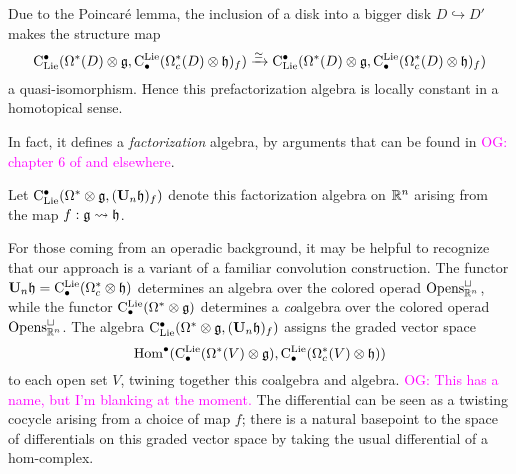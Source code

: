 \documentclass[11pt]{amsart}
\numberwithin{equation}{section}
\def\owen{\textcolor{magenta}{OG: }\textcolor{magenta}}
\begin{document}
Due to the Poincar\'e lemma, the inclusion of a disk into a bigger disk $D \hookrightarrow D'$ makes the structure map 
\[
{\rm C}_{\rm Lie}^\bullet(\Omega^*(D) \otimes \mathfrak g, {\rm C}^{\rm Lie}_\bullet(\Omega^*_c(D) \otimes \mathfrak h)_f) \xrightarrow{\simeq} {\rm C}_{\rm Lie}^\bullet(\Omega^*(D) \otimes \mathfrak g, {\rm C}^{\rm Lie}_\bullet(\Omega^*_c(D) \otimes \mathfrak h)_f)
\]
a quasi-isomorphism.
Hence this prefactorization algebra is locally constant in a homotopical sense.

In fact, it defines a {\em factorization} algebra, by arguments that can be found in \owen{chapter 6 of \cite{CG1} and elsewhere}.

\begin{dfn}
\label{dfn: centralizer for f}
Let ${\rm C}_{\rm Lie}^\bullet(\Omega^* \otimes \mathfrak g, (\mathbf U_n \mathfrak h)_f)$ denote this factorization algebra on $\mathbb R^n$ arising from the map $f: \mathfrak g \rightsquigarrow \mathfrak h$.
\end{dfn}

\begin{rmk}
For those coming from an operadic background, it may be helpful to recognize that our approach is a variant of a familiar convolution construction.
The functor $\mathbf U_n \mathfrak h = {\rm C}^{\rm Lie}_\bullet(\Omega^*_c \otimes \mathfrak h)$ determines an algebra over the colored operad ${\rm Opens}_{\mathbb R^n}^\sqcup$,
while the functor ${\rm C}^{\rm Lie}_\bullet(\Omega^* \otimes \mathfrak g)$ determines a {\em co}\/algebra over the colored operad ${\rm Opens}_{\mathbb R^n}^\sqcup$.
The algebra ${\rm C}_{\rm Lie}^\bullet(\Omega^* \otimes \mathfrak g, (\mathbf U_n \mathfrak h)_f)$ assigns the graded vector space
\[
{\rm Hom}^\bullet({\rm C}^{\rm Lie}_\bullet(\Omega^*(V) \otimes \mathfrak g), {\rm C}^{\rm Lie}_\bullet(\Omega^*_c(V) \otimes \mathfrak h))
\] 
to each open set $V$,
twining together this coalgebra and algebra.
\owen{This has a name, but I'm blanking at the moment.}
The differential can be seen as a twisting cocycle arising from a choice of map $f$;
there is a natural basepoint to the space of differentials on this graded vector space by taking the usual differential of a hom-complex.
\end{rmk}

%
%
%
%
\end{document}
